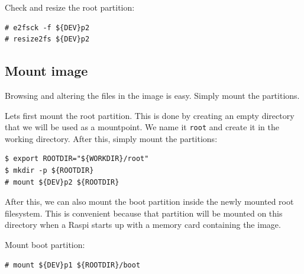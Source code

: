 Check and resize the root partition:
\begin{lstlisting}[]
# e2fsck -f ${DEV}p2
# resize2fs ${DEV}p2
\end{lstlisting}
\FloatBarrier



\subsection{Mount image}

Browsing and altering the files in the image is easy. Simply mount the partitions.

Lets first mount the root partition. This is done by creating an empty directory
that we will be used as a mountpoint. We name it \texttt{root} and create it in the
working directory.
After this, simply mount the partitions:

\begin{lstlisting}[]
$ export ROOTDIR="${WORKDIR}/root"
$ mkdir -p ${ROOTDIR}
# mount ${DEV}p2 ${ROOTDIR}
\end{lstlisting}
\FloatBarrier
\vspace{-5mm}

After this, we can also mount the boot partition inside the newly mounted
root filesystem. This is convenient because that partition will be mounted
on this directory when a \ac{Raspi} starts up with a memory card containing
the image. %

Mount boot partition:
\begin{lstlisting}[]
# mount ${DEV}p1 ${ROOTDIR}/boot
\end{lstlisting}
\FloatBarrier
\vspace{-5mm}

